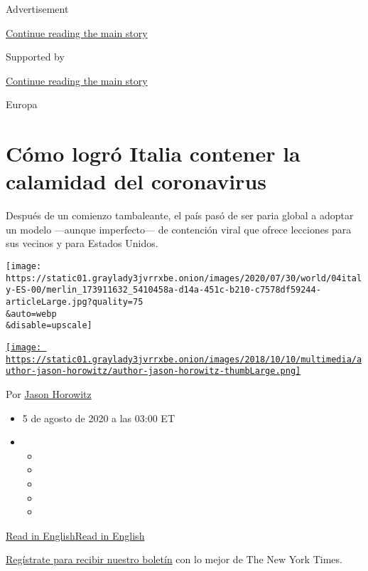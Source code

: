 Advertisement

\protect\hyperlink{after-top}{Continue reading the main story}

Supported by

\protect\hyperlink{after-sponsor}{Continue reading the main story}

Europa

\hypertarget{cuxf3mo-logruxf3-italia-contener-la-calamidad-del-coronavirus}{%
\section{Cómo logró Italia contener la calamidad del
coronavirus}\label{cuxf3mo-logruxf3-italia-contener-la-calamidad-del-coronavirus}}

Después de un comienzo tambaleante, el país pasó de ser paria global a
adoptar un modelo ---aunque imperfecto--- de contención viral que ofrece
lecciones para sus vecinos y para Estados Unidos.

\texttt{[image: https://static01.graylady3jvrrxbe.onion/images/2020/07/30/world/04italy-ES-00/merlin\_173911632\_5410458a-d14a-451c-b210-c7578df59244-articleLarge.jpg?quality=75\\\&auto=webp\\\&disable=upscale]}

\href{https://www.nytimes3xbfgragh.onion/by/jason-horowitz}{\texttt{[image: https://static01.graylady3jvrrxbe.onion/images/2018/10/10/multimedia/author-jason-horowitz/author-jason-horowitz-thumbLarge.png]}}

Por \href{https://www.nytimes3xbfgragh.onion/by/jason-horowitz}{Jason
Horowitz}

\begin{itemize}
\item
  5 de agosto de 2020 a las 03:00 ET
\item
  \begin{itemize}
  \item
  \item
  \item
  \item
  \item
  \end{itemize}
\end{itemize}

\href{https://www.nytimes3xbfgragh.onion/2020/07/31/world/europe/italy-coronavirus-reopening.html}{Read
in
English}\href{https://www.nytimes3xbfgragh.onion/2020/07/31/world/europe/italy-coronavirus-reopening.html}{Read
in English}

\href{https://www.nytimes3xbfgragh.onion/newsletters/el-times}{Regístrate
para recibir nuestro boletín} con lo mejor de The New York Times.

